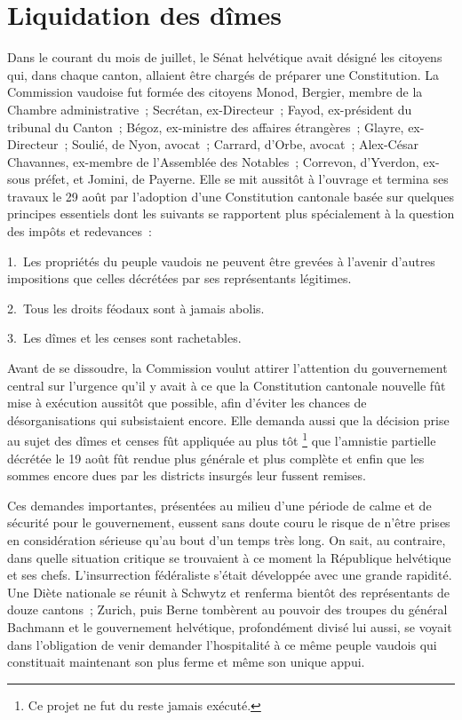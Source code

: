 \documentclass[french,twoside]{book} %
\begin{document}
\section[Liquidation des dîmes]{Liquidation des dîmes}
\noindent Dans le courant du mois de juillet, le Sénat helvétique avait désigné les citoyens qui, dans chaque canton, allaient être chargés de préparer une Constitution. La Commission vaudoise fut formée des citoyens Monod, Bergier, membre de la Chambre administrative ; Secrétan, ex-Directeur ; Fayod, ex-président du tribunal du Canton ; Bégoz, ex-ministre des affaires étrangères ; Glayre, ex-Directeur ; Soulié, de Nyon, avocat ; Carrard, d’Orbe, avocat ; Alex-César Chavannes, ex-membre de l’Assemblée des Notables ; Correvon, d’Yverdon, ex-sous préfet, et Jomini, de Payerne. Elle se mit aussitôt à l’ouvrage et termina ses travaux le 29 août par l’adoption d’une Constitution cantonale basée sur quelques principes essentiels dont les suivants se rapportent plus spécialement à la question des impôts et redevances :\par
1. Les propriétés du peuple vaudois ne peuvent être grevées à l’avenir d’autres impositions que celles décrétées par ses représentants légitimes.\par
2. Tous les droits féodaux sont à jamais abolis.\par
3. Les dîmes et les censes sont rachetables.\par
Avant de se dissoudre, la Commission voulut attirer l’attention du gouvernement central sur l’urgence qu’il y avait à ce que la Constitution cantonale nouvelle fût mise à exécution aussitôt que possible, afin d’éviter les chances de désorganisations qui subsistaient encore. Elle demanda aussi que la décision prise au sujet des dîmes et censes fût appliquée au plus tôt \footnote{Ce projet ne fut du reste jamais exécuté.} que l’amnistie partielle décrétée le 19 août fût rendue plus générale et plus complète et enfin que les sommes encore dues par les districts insurgés leur fussent remises.\par
Ces demandes importantes, présentées au milieu d’une période de calme et de sécurité pour le gouvernement, eussent sans doute couru le risque de n’être prises en considération sérieuse qu’au bout d’un temps très long. On sait, au contraire, dans quelle situation critique se trouvaient à ce moment la République helvétique et ses chefs. L’insurrection fédéraliste s’était développée avec une grande rapidité. Une Diète nationale se réunit à Schwytz et renferma bientôt des représentants de douze cantons ; Zurich, puis Berne tombèrent au pouvoir des troupes du général Bachmann et le gouvernement helvétique, profondément divisé lui aussi, se voyait dans l’obligation de venir demander l’hospitalité à ce même peuple vaudois qui constituait maintenant son plus ferme et même son unique appui.\par
\end{document}
